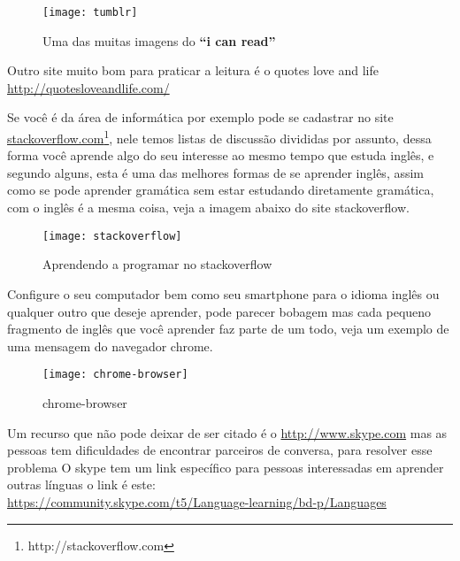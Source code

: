 \begin{figure}[h!]
	\caption{\footnotesize Uma das muitas imagens do {\bf ``i can read''}}
    \centering
		\texttt{[image: tumblr]}
\end{figure}

\noindent
{\footnotesize {} Outro site muito bom para praticar a leitura é o quotes love and life
 \href{http://quotesloveandlife.com/}{http://quotesloveandlife.com/} }

\noindent Se você é da área de informática por exemplo pode se cadastrar no
site \href{http://stackoverflow.com}{stackoverflow.com}\footnote{http://stackoverflow.com},
nele temos listas de discussão divididas por assunto, dessa forma você aprende
algo do seu interesse ao mesmo tempo que estuda inglês, e segundo alguns, esta
é uma das melhores formas de se aprender inglês, assim como se pode aprender
gramática sem estar estudando diretamente gramática, com o inglês é a mesma
coisa, veja a imagem abaixo do site stackoverflow.

\begin{figure}[h!]
	\caption{\footnotesize Aprendendo a programar no stackoverflow}
	\centering
		\texttt{[image: stackoverflow]}
	\label{img:stackoverflow}
\end{figure}

\newpage
\noindent
Configure o seu computador bem como seu smartphone para o idioma
inglês ou qualquer outro que deseje aprender, pode parecer bobagem
mas cada pequeno fragmento de inglês que você aprender faz parte de um
todo, veja um exemplo de uma mensagem do navegador chrome.

\begin{figure}[h!]
	\centering
	\texttt{[image: chrome-browser]}
	\caption{chrome-browser}
\end{figure}

\noindent {}
Um recurso que não pode deixar de ser citado é o \href{http://www.skype.com}{http://www.skype.com} mas
as pessoas tem dificuldades de encontrar parceiros de conversa, para resolver esse problema
O skype tem um link específico para pessoas interessadas em aprender outras línguas o link é este:  \\

\newpage
\href{https://community.skype.com/t5/Language-learning/bd-p/Languages}{https://community.skype.com/t5/Language-learning/bd-p/Languages}

